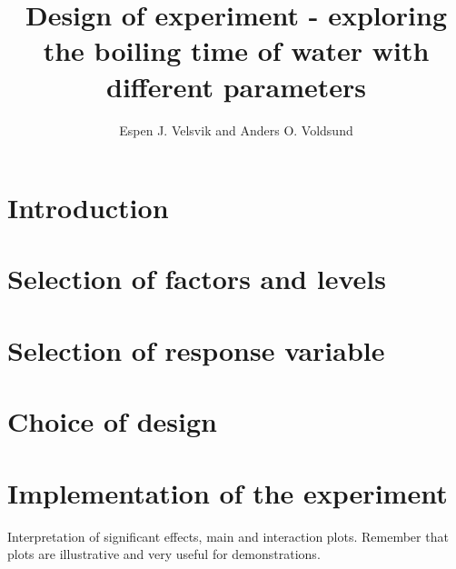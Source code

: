 \documentclass[10pt,a4paper]{article}
\begin{document}
\title{Design of experiment - exploring the boiling time of water with different parameters}
\author{Espen J. Velsvik and Anders O. Voldsund}
\maketitle

\section{Introduction}


\section{Selection of factors and levels}


\section{Selection of response variable}


\section{Choice of design}


\section{Implementation of the experiment}



Interpretation of significant effects, main and interaction plots.
Remember that plots are illustrative and very useful for demonstrations.
\end{document}
